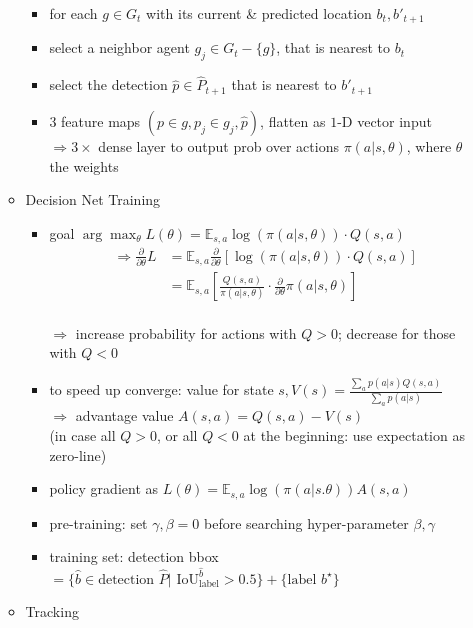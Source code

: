 \begin{itemize}
\begin{itemize}
		\begin{itemize}
		\item for each $g\in G_t$ with its current \& predicted location $b_t, b'_{t+1}$
		\item select a neighbor agent $g_{j} \in G_t-\{g\}$, that is nearest to $b_{t}$
		\item select the detection $\hat p \in \hat P_{t+1}$ that is nearest to $b'_{t+1}$
		\item 3 feature maps $(p\in g, p_j\in g_j, \hat p)$, flatten as $1$-D vector input \\
		$\Rightarrow 3\times$ dense layer to output prob over actions $\pi(a|s,\theta)$, where $\theta$ the weights
		\end{itemize}
	\item Decision Net Training
		\begin{itemize}
		\item goal $\displaystyle \arg \max_{\theta} L(\theta) = \mathbb E_{s,a} \log (\pi (a|s,\theta)) \cdot Q(s,a)$ \\
		\begin{align*} \displaystyle \Rightarrow \frac \partial {\partial \theta} L  &= \mathbb E_{s,a} \frac \partial {\partial \theta}[ \log (\pi (a|s,\theta)) \cdot Q(s,a) ] \\ &= \mathbb E_{s,a} [\frac{Q(s,a)}{\pi(a|s,\theta)} \cdot \frac {\partial }{\partial \theta} \pi(a|s,\theta)] \end{align*} \\
		$\Rightarrow$ increase probability for actions with $Q>0$; decrease for those with $Q<0$
		\item to speed up converge: value for state $s, \displaystyle V(s) = \frac{\sum_{a}p(a|s)Q(s,a)} {\sum_{a} p(a|s)}$ \\
		$\Rightarrow$ advantage value $A(s,a) = Q(s,a) - V(s)$ \\
		(in case all $Q>0$, or all $Q<0$ at the beginning: use expectation as zero-line)
		\item policy gradient as $L(\theta) = \mathbb E_{s,a} \log(\pi(a|s.\theta)) A(s,a)$
		\item pre-training: set $\gamma, \beta = 0$ before searching hyper-parameter $\beta,\gamma$
		\item training set: detection bbox $=\{ \hat b \in \text{detection } \hat P | \text{ IoU}^{\hat b}_\text{label} > 0.5 \} + \{\text{label } b^\star \}$
		\end{itemize}
	\item Tracking
		\begin{itemize}

\end{itemize}
\end{itemize}
\end{itemize}
